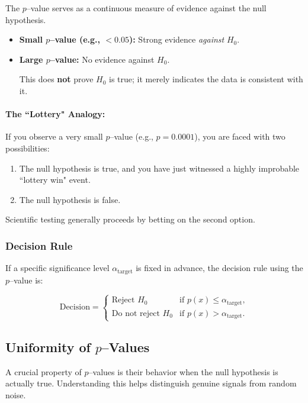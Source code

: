 The \(p\)--value serves as a continuous measure of evidence against the null hypothesis.

\begin{itemize}
    \item \textbf{Small \(p\)--value (e.g., $< 0.05$):} Strong evidence \textit{against} $H_0$. 
    \item \textbf{Large \(p\)--value:} No evidence against $H_0$. 
        \begin{remark}[]
        This does \textbf{not} prove $H_0$ is true; it merely indicates the data is consistent with it.
        \end{remark}
\end{itemize}

\paragraph{The ``Lottery" Analogy:}
If you observe a very small \(p\)--value (e.g., $p = 0.0001$), you are faced with two possibilities:
\begin{enumerate}[label=\alph*)]
    \item The null hypothesis is true, and you have just witnessed a highly improbable ``lottery win" event.
    \item The null hypothesis is false.
\end{enumerate}
Scientific testing generally proceeds by betting on the second option.

\subsubsection{Decision Rule}
If a specific significance level $\alpha_{\text{target}}$ is fixed in advance, the decision rule using the \(p\)--value is:

\[
\text{Decision} = \begin{cases} 
\text{Reject } H_0 & \text{if } p(x) \le \alpha_{\text{target}}, \\
\text{Do not reject } H_0 & \text{if } p(x) > \alpha_{\text{target}}.
\end{cases}
\]

\subsection{Uniformity of \(p\)--Values}
\label{sec:uniformity_p_values}

A crucial property of \(p\)--values is their behavior when the null hypothesis is actually true. Understanding this helps distinguish genuine signals from random noise.

